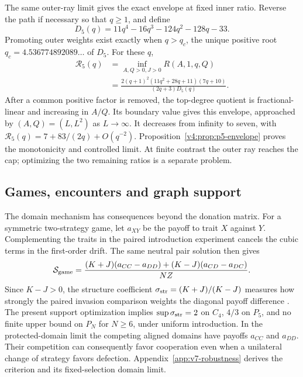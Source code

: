 \documentclass[aps,pre,reprint,amsmath,amssymb,longbibliography]{revtex4-2}
\begin{document}
The same outer-ray limit gives the exact envelope at fixed inner ratio.
Reverse the path if necessary so that $q\ge1$, and define
\begin{equation}
 D_5(q)=11q^4-16q^3-124q^2-128q-33.
 \label{eq:v4-p5-inner-polynomial}
\end{equation}
Promoting outer weights exist exactly when $q>q_c$, the unique
positive root $q_c=4.536774892089\ldots$ of $D_5$. For these $q$,
\begin{equation}
 \begin{aligned}
 \mathcal R_5(q)&=\inf_{A,Q>0,J>0}R(A,1,q,Q)\\
 &=\frac{2(q+1)^2(11q^2+28q+11)(7q+10)}{(2q+3)D_5(q)}.
 \end{aligned}
 \label{eq:v4-p5-envelope}
\end{equation}
After a common positive factor is removed, the top-degree quotient is
fractional-linear and increasing in $A/Q$. Its boundary value gives
this envelope, approached by $(A,Q)=(L,L^2)$ as $L\to\infty$.
It decreases from infinity to seven, with
$\mathcal R_5(q)=7+83/(2q)+O(q^{-2})$.
Proposition~\ref{v4:prop:p5-envelope} proves the monotonicity and
controlled limit. At finite contrast the outer ray reaches the cap;
optimizing the two remaining ratios is a separate problem.


\subsection{Games, encounters and graph support}
\label{sec:v7-robustness}
The domain mechanism has consequences beyond the donation matrix.
For a symmetric two-strategy game, let $a_{XY}$ be the payoff to trait
$X$ against $Y$. Complementing the traits in the paired introduction
experiment cancels the cubic terms in the first-order drift. The same
neutral pair solution then gives
\begin{equation}
 \mathcal S_{\rm game}
 =\frac{(K+J)(a_{CC}-a_{DD})
       +(K-J)(a_{CD}-a_{DC})}{NZ}.
 \label{eq:v7-general-game}
\end{equation}
Since $K-J>0$, the structure coefficient
$\sigma_{\rm str}=(K+J)/(K-J)$ measures how strongly the paired
invasion comparison weights the diagonal payoff difference
\cite{TarnitaEtAl2009}. The present support optimization implies
$\sup\sigma_{\rm str}=2$ on $C_4$, $4/3$ on $P_5$, and no finite
upper bound on $P_N$ for $N\ge6$, under uniform introduction.
In the protected-domain limit the competing aligned domains have
payoffs $a_{CC}$ and $a_{DD}$. Their competition can consequently
favor cooperation even when a unilateral change of strategy favors
defection. Appendix~\ref{app:v7-robustness} derives the criterion and
its fixed-selection domain limit.
\end{document}
